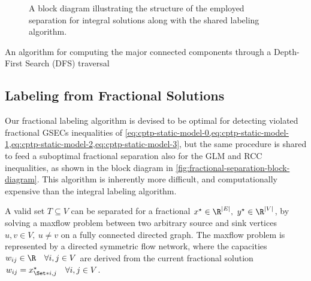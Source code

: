 \begin{figure}[ht]
	\centering
	\caption{
		A block diagram illustrating the structure
		of the employed separation for integral solutions along with the shared labeling algorithm.
	}
	\label{fig:integral-separation-block-diagram}
\end{figure}

\begin{algorithm}
	\caption{An algorithm for computing the major connected components through a Depth-First Search (DFS) traversal}
	
	\label{algo:cc-dfs}
\end{algorithm}

\subsection{Labeling from Fractional Solutions}
\label{sec:impl-labeling-fractional-solutions}

Our fractional labeling algorithm is devised to be optimal for
detecting violated fractional GSECs inequalities
of \cref{eq:cptp-static-model-0,eq:cptp-static-model-1,eq:cptp-static-model-2,eq:cptp-static-model-3},
but the same procedure is shared
to feed a suboptimal fractional separation also for the GLM and RCC inequalities,
as shown in the block diagram in \cref{fig:fractional-separation-block-diagram}.
This algorithm is inherently more difficult, and computationally expensive
than the integral labeling algorithm.

A valid set $T \subseteq V$ can be separated for a fractional $x^\star \in \R^{|E|},\ y^\star \in \R^{|V|}$,
by solving a
maxflow problem between two arbitrary source and sink vertices $u, v \in V,\ u \ne v$ on a fully connected directed graph.
The maxflow problem is represented by a directed symmetric flow network,
where the capacities $w_{ij} \in \R \quad \forall i, j \in V$
are derived from the current fractional solution $w_{ij} = x^\star_{\Set*{i, j}} \quad \forall i, j \in V$.

